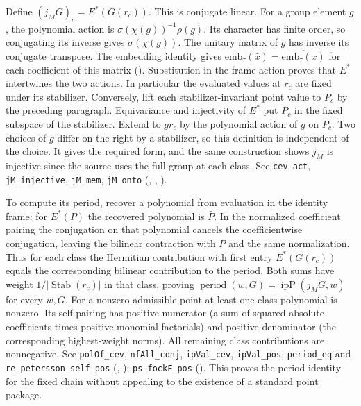 Define $(j_M G)_c=E^*(G(r_c))$. This is conjugate linear. For a group
element $g$, the polynomial action is $\sigma(\chi(g))^{-1}\rho(g)$.
Its character has finite order, so conjugating its inverse gives
$\sigma(\chi(g))$. The unitary matrix of $g$ has inverse its conjugate
transpose. The embedding identity  gives
$\mathrm{emb}_\tau(\bar x)=\overline{\mathrm{emb}_\tau(x)}$ for each
coefficient of this matrix ().
Substitution in the frame action proves that $E^*$ intertwines
the two actions. In particular the evaluated values at $r_c$ are fixed
under its stabilizer. Conversely, lift each stabilizer-invariant point
value to $P_c$ by the preceding paragraph. Equivariance and injectivity
of $E^*$ put $P_c$ in the fixed subspace of the stabilizer. Extend to
$g r_c$ by the polynomial action of $g$ on $P_c$. Two choices of $g$
differ on the right by a stabilizer, so this definition is independent
of the choice. It gives the required form, and the same construction
shows $j_M$ is injective since the source uses the full group at each
class. See \nolinkurl{cev_act}, \nolinkurl{jM_injective},
\nolinkurl{jM_mem}, \nolinkurl{jM_onto}
(, ,
).

To compute its period, recover a polynomial from evaluation in the
identity frame: for $E^*(P)$ the recovered polynomial is $\bar P$.
In the normalized coefficient pairing the conjugation on that polynomial
cancels the coefficientwise conjugation, leaving the bilinear contraction
with $P$ and the same normalization. Thus for each class the Hermitian
contribution with first entry $E^*(G(r_c))$ equals the corresponding
bilinear contribution to the period. Both sums have weight
$1/|\operatorname{Stab}(r_c)|$ in that class, proving
$\operatorname{period}(w,G)=\operatorname{ipP}(j_M G,w)$ for every $w,G$.
For a nonzero admissible point at least one class polynomial is nonzero.
Its self-pairing has positive numerator (a sum of squared absolute
coefficients times positive monomial factorials) and positive denominator
(the corresponding highest-weight norms). All remaining class
contributions are nonnegative. See \nolinkurl{polOf_cev},
\nolinkurl{nfAll_conj}, \nolinkurl{ipVal_cev}, \nolinkurl{ipVal_pos},
\nolinkurl{period_eq} and \nolinkurl{re_petersson_self_pos}
(, );
\nolinkurl{ps_fockF_pos}
().
This proves the period identity for the fixed chain without appealing to
the existence of a standard point package.

